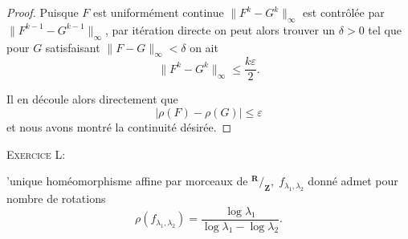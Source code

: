 \documentclass[12pt]{article}
\newenvironment{ex}[1]
{\begin{mdframed}[linewidth=0.6pt]
        \textsc{Exercice #1:}

}
    {\end{mdframed}}
\newcommand{\R}{\mathbf{R}}
\newcommand{\Z}{\mathbf{Z}}
\newcommand*\quot[2]{{^{\textstyle #1}\big/_{\textstyle #2}}}
\theoremstyle{remark}
\begin{document}
\begin{proof}
        Puisque $F$ est uniformément continue $\|F^{k}-G^{k}\|_{\infty}$ est contrôlée par $\|F^{k-1}-G^{k-1}\|_{\infty}$, par itération directe on peut alors trouver un $\delta > 0$ tel que pour $G$ satisfaisant $\|F-G\|_{\infty} < \delta$ on ait \[
                \|F^{k}-G^{k}\|_{\infty} \le \frac{k\varepsilon}{2}
        .\] 

        Il en découle alors directement que \[
                |\rho(F)-\rho(G)| \le \varepsilon
        \] et nous avons montré la continuité désirée. 
\end{proof}

\newpage

\begin{ex}{2}
        L'unique homéomorphisme affine par morceaux de $\quot{\R}{\Z}, \; f_{\lambda_1, \lambda_2}$ donné admet pour nombre de rotations
        \[
                \rho(f_{\lambda_1, \lambda_2}) = \frac{\log\lambda_1} {\log\lambda_1 -\log\lambda_2}
        .\] 
\end{ex}
\end{document}
